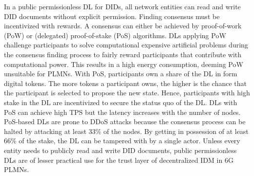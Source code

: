 \documentclass[conference]{IEEEtran}
\begin{document}
In a public permissionless DL for DIDs, all network entities can read and write DID documents without explicit permission. Finding consensus must be incentivized with rewards. A consensus can either be achieved by proof-of-work (PoW) or (delegated) proof-of-stake (PoS) algorithms. DLs applying PoW challenge participants to solve computational expensive artificial problems during the consensus finding process to fairly reward participants that contribute with computational power. This results in a high energy consumption, deeming PoW unsuitable for PLMNs. With PoS, participants own a share of the DL in form digital tokens. The more tokens a participant owns, the higher is the chance that the participant is selected to propose the new state. Hence, participants with high stake in the DL are incentivized to secure the status quo of the DL. DLs with PoS can achieve high TPS but the latency increases with the number of nodes. PoS-based DLs are prone to DDoS attacks because the consensus process can be halted by attacking at least 33\% of the nodes. By getting in possession of at least 66\% of the stake, the DL can be tampered with by a single actor. Unless every entity needs to publicly read and write DID documents, public permissionless DLs are of lesser practical use for the trust layer of decentralized IDM in 6G PLMNs.     


\end{document}
